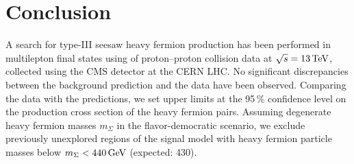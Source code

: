 \chapter{Conclusion}
\label{sec:Summary}

A search for type-III seesaw heavy fermion production has been performed in multilepton final states using \fullLumi of proton--proton collision data at $\sqrt{s} = 13\,\text{Te\hspace{-.08em}V}$, collected using the CMS detector at the CERN LHC. No significant discrepancies between the background prediction and the data have been observed. Comparing the data with the predictions, we set upper limits at the 95\,\% confidence level on the production cross section of the heavy fermion pairs. Assuming degenerate heavy fermion masses $m_\Sigma$ in the flavor-democratic scenario, we exclude previously unexplored regions of the signal model with heavy fermion particle masses below $m_\Sigma < 440\,\text{Ge\hspace{-.08em}V}$ (expected: 430\GeV).
